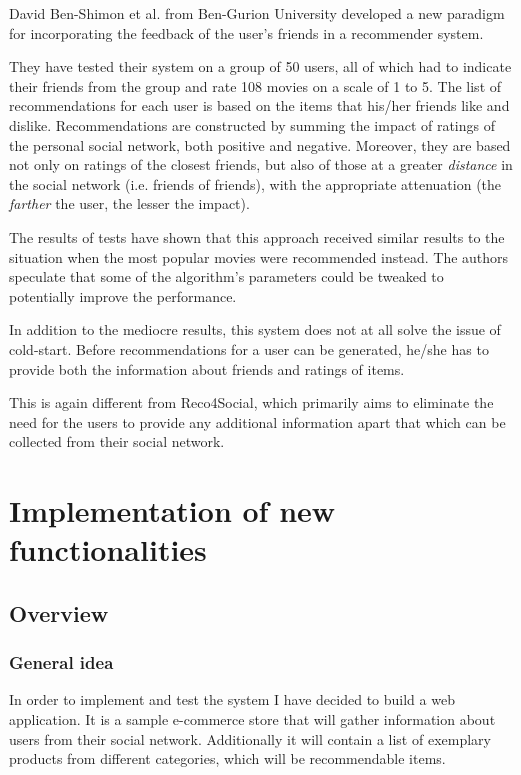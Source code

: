 \documentclass[12pt]{report}
\begin{document}
David Ben-Shimon et al. \cite{ben_gurion} from Ben-Gurion University developed a new paradigm for incorporating the feedback of the user's friends in a recommender system. 

They have tested their system on a group of 50 users, all of which had to indicate their friends from the group and rate 108 movies on a scale of 1 to 5. The list of recommendations for each user is based on the items that his/her friends like and dislike. Recommendations are constructed by summing the impact of ratings of the personal social network, both positive and negative. Moreover, they are based not only on ratings of the closest friends, but also of those at a greater \textit{distance} in the social network (i.e. friends of friends), with the appropriate attenuation (the \textit{farther} the user, the lesser the impact).

The results of tests have shown that this approach received similar results to the situation when the most popular movies were recommended instead. The authors speculate that some of the algorithm's parameters could be tweaked to potentially improve the performance.

\hbox{}
In addition to the mediocre results, this system does not at all solve the issue of cold-start. Before recommendations for a user can be generated, he/she has to provide both the information about friends and ratings of items.

This is again different from Reco4Social, which primarily aims to eliminate the need for the users to provide any additional information apart that which can be collected from their social network.




\chapter{Implementation of new functionalities}
\label{ch.implementation}

\section{Overview}
\subsection{General idea}
In order to implement and test the system I have decided to build a web application. It is a sample e-commerce store that will gather information about users from their social network. Additionally it will contain a list of exemplary products from different categories, which will be recommendable items. 
\end{document}

